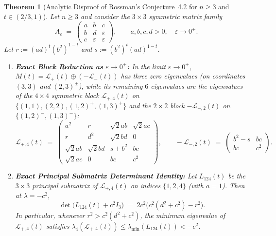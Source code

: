 \documentclass[11pt,a4paper]{article}
\theoremstyle{plain}
\newtheorem{theorem}{Theorem}[section]
\theoremstyle{definition}
\theoremstyle{remark}
\begin{document}
\begin{theorem}[Analytic Disproof of Rossman's Conjecture~4.2 for $n \ge 3$ and $t \in (2/3, 1)$]\label{thm:disproof}
Let $n \ge 3$ and consider the $3 \times 3$ symmetric matrix family
\begin{equation}\label{eq:A3_family}
  A_\varepsilon \;=\; \begin{pmatrix} a & b & c \\ b & d & \varepsilon \\ c & \varepsilon & \varepsilon \end{pmatrix}, \qquad a, b, c, d > 0, \quad \varepsilon \to 0^+.
\end{equation}
Let $r := (ad)^t(b^2)^{1-t}$ and $s := (b^2)^t(ad)^{1-t}$.
\begin{enumerate}[label=(\alph*)]
  \item \textbf{Exact Block Reduction as $\varepsilon \to 0^+$:} In the limit $\varepsilon \to 0^+$, $M(t) = \mathcal{L}_+(t) \oplus (-\mathcal{L}_-(t))$ has three zero eigenvalues (on coordinates $(3,3)$ and $(2,3)^\pm$), while its remaining $6$ eigenvalues are the eigenvalues of the $4 \times 4$ symmetric block $\mathcal{L}_{+,4}(t)$ on $\{(1,1), (2,2), (1,2)^+, (1,3)^+\}$ and the $2 \times 2$ block $-\mathcal{L}_{-,2}(t)$ on $\{(1,2)^-, (1,3)^-\}$:
  \begin{equation}\label{eq:Lplus4_Lminus2}
    \mathcal{L}_{+,4}(t) \;=\; \begin{pmatrix}
      a^2 & r & \sqrt{2}ab & \sqrt{2}ac \\
      r & d^2 & \sqrt{2}bd & 0 \\
      \sqrt{2}ab & \sqrt{2}bd & s + b^2 & bc \\
      \sqrt{2}ac & 0 & bc & c^2
    \end{pmatrix}, \qquad
    -\mathcal{L}_{-,2}(t) \;=\; \begin{pmatrix}
      b^2 - s & bc \\
      bc & c^2
    \end{pmatrix}.
  \end{equation}
  \item \textbf{Exact Principal Submatrix Determinant Identity:} Let $L_{124}(t)$ be the $3 \times 3$ principal submatrix of $\mathcal{L}_{+,4}(t)$ on indices $\{1, 2, 4\}$ (with $a = 1$). Then at $\lambda = -c^2$,
  \begin{equation}\label{eq:det_L124}
    \boxed{\det\big(L_{124}(t) + c^2 I_3\big) \;=\; 2c^2\Big(c^2(d^2 + c^2) - r^2\Big).}
  \end{equation}
  In particular, whenever $r^2 > c^2(d^2 + c^2)$, the minimum eigenvalue of $\mathcal{L}_{+,4}(t)$ satisfies $\lambda_4(\mathcal{L}_{+,4}(t)) \le \lambda_{\min}(L_{124}(t)) < -c^2$.

\end{enumerate}
\end{theorem}
\end{document}
